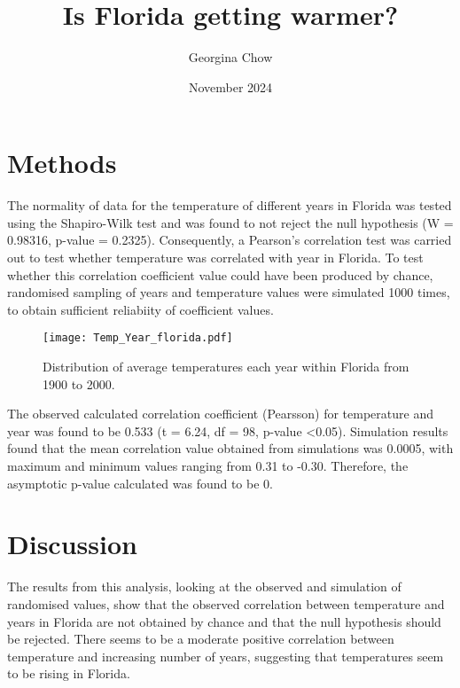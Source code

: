 \documentclass[12pt]{article}
\title{\vspace{-2cm}Is Florida getting warmer?\vspace{-0.5cm}}
\author{\vspace{-0.5cm}Georgina Chow\vspace{-0.5cm}}
\date{\vspace{-0.5cm}November 2024\vspace{-1cm}}
\begin{document}
  \maketitle

  \section{Methods}
  The normality of data for the temperature of different years in Florida was tested using the 
  Shapiro-Wilk test and was found to not reject the null hypothesis (W = 0.98316, p-value = 0.2325).
  Consequently, a Pearson's correlation test was carried out to test whether temperature was correlated
  with year in Florida. To test whether this correlation coefficient value could have been produced by chance,
  randomised sampling of years and temperature values were simulated 1000 times, to obtain sufficient reliabiity 
  of coefficient values.

  \begin{figure}[h!]
    \centering
    \texttt{[image: Temp\_Year\_florida.pdf]}    
    \caption{Distribution of average temperatures each year within Florida from 1900 to 2000.}
    \label{fig1}
  \end{figure}

    The observed calculated correlation coefficient (Pearsson) for temperature and year was found to be 
    0.533 (t = 6.24, df = 98, p-value <0.05). Simulation results found that the mean correlation value obtained
    from simulations was 0.0005, with maximum and minimum values ranging from 0.31 to -0.30. Therefore, the 
    asymptotic p-value calculated was found to be 0. 

    \section{Discussion}
    The results from this analysis, looking at the observed and simulation of randomised values, 
    show that the observed correlation between temperature and years in Florida are not obtained by chance 
    and that the null hypothesis should be rejected. There seems to be a moderate positive correlation between 
    temperature and increasing number of years, suggesting that temperatures seem to be rising in Florida.
\end{document}
